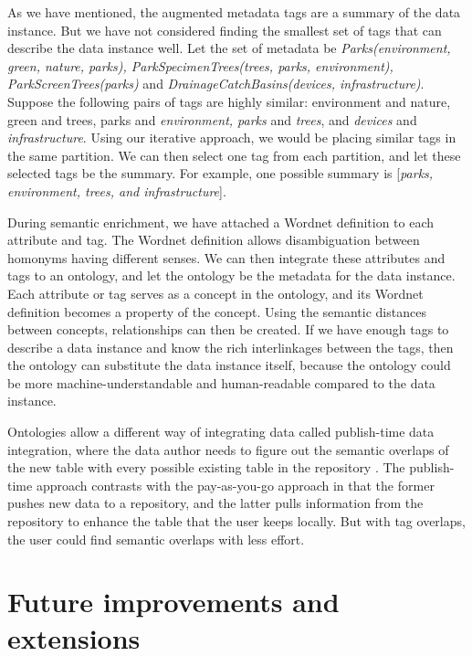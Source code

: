 As we have mentioned, the augmented metadata tags are a summary of the data instance. But we have not considered finding the smallest set of tags that can describe the data instance well. Let the set of metadata be \textit{Parks(environment, green, nature, parks), ParkSpecimenTrees(trees, parks, environment), ParkScreenTrees(parks)} and \textit{DrainageCatchBasins(devices, infrastructure)}. Suppose the following pairs of tags are highly similar: environment and nature, green and trees, parks and \textit{environment, parks} and \textit{trees}, and \textit{devices} and \textit{infrastructure}. Using our iterative approach, we would be placing similar tags in the same partition. We can then select one tag from each partition, and let these selected tags be the summary. For example, one possible summary is [\textit{parks, environment, trees, and infrastructure}].

During semantic enrichment, we have attached a Wordnet definition to each attribute and tag. The Wordnet definition allows disambiguation between homonyms having different senses. We can then integrate these attributes and tags to an ontology, and let the ontology be the metadata for the data instance. Each attribute or tag serves as a concept in the ontology, and its Wordnet definition becomes a property of the concept. Using the semantic distances between concepts, relationships can then be created. If we have enough tags to describe a data instance and know the rich interlinkages between the tags, then the ontology can substitute the data instance itself, because the ontology could be more machine-understandable and human-readable compared to the data instance.

Ontologies allow a different way of integrating data called publish-time data integration, where the data author needs to figure out the semantic overlaps of the new table with every possible existing table in the repository \cite{Diego2018Machine}. The publish-time approach contrasts with the pay-as-you-go approach in that the former pushes new data to a repository, and the latter pulls information from the repository to enhance the table that the user keeps locally. But with tag overlaps, the user could find semantic overlaps with less effort.

\section{Future improvements and extensions}
\label{sec:FutureImprovementsAndExtensions}

